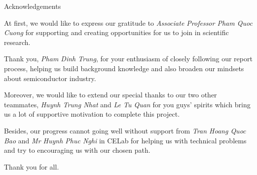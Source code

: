 \begin{preface}{Acknowledgements}

  At first, we would like to express our gratitude to \textit{Associate Professor Pham Quoc Cuong} for supporting and creating opportunities for us to join in scientific research. 
  
  Thank you, \textit{Pham Dinh Trung}, for your enthusiasm of closely following our report process, helping us build background knowledge and also broaden our mindsets about semiconductor industry.
  
  Moreover, we would like to extend our special thanks to our two other teammates, \textit{Huynh Trung Nhat} and \textit{Le Tu Quan} for you guys' spirits which bring us a lot of supportive motivation to complete this project.

  Besides, our progress cannot going well without support from \textit{Tran Hoang Quoc Bao} and \textit{Mr Huynh Phuc Nghi} in CELab for helping us with technical problems and try to encouraging us with our chosen path.

  Thank you for all.
\end{preface}

